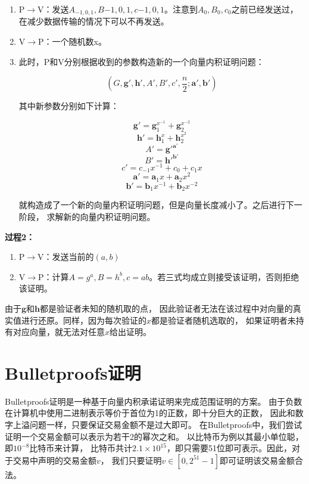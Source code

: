 \begin{enumerate}
    \item P$\to$V：发送$A_{-1, 0, 1}, B{-1, 0, 1}, c{-1, 0, 1}$。注意到$A_0, B_0, c_0$之前已经发送过，
    在减少数据传输的情况下可以不再发送。
    
    \item V$\to$P：一个随机数x。
    
    \item 此时，P和V分别根据收到的参数构造新的一个向量内积证明问题：
    
    $$(G,\boldsymbol{g}',\boldsymbol{h}',A',B',c',\frac{n}{2};\boldsymbol{a}',\boldsymbol{b}')$$
    
    其中新参数分别如下计算：
    
    $$\boldsymbol{g}'=\boldsymbol{g}_1^{x^{-1}}+\boldsymbol{g}_2^{x^{-2}}$$
    $$\boldsymbol{h}'=\boldsymbol{h}_1^{x}+\boldsymbol{h}_2^{x^{2}}$$
    $$A'=\boldsymbol{g}'^{\boldsymbol{a}'}$$
    $$B'=\boldsymbol{h}'^{\boldsymbol{b}'}$$
    $$c'=c_{-1}x^{-1}+c_0+c_1x$$
    $$\boldsymbol{a}'=\boldsymbol{a}_1x+\boldsymbol{a}_2x^2$$
    $$\boldsymbol{b}'=\boldsymbol{b}_1x^{-1}+\boldsymbol{b}_2x^{-2}$$
    
    就构造成了一个新的向量内积证明问题，但是向量长度减小了。之后进行下一阶段，
    求解新的向量内积证明问题。
\end{enumerate}

\textbf{过程2：}
\begin{enumerate}
    \item P$\to$V：发送当前的$(a,b)$
    \item V$\to$P：计算$A=g^a, B=h^b, c=ab$。若三式均成立则接受该证明，否则拒绝该证明。
\end{enumerate}

由于$\boldsymbol{g}$和$\boldsymbol{h}$都是验证者未知的随机取的点，
因此验证者无法在该过程中对向量的真实值进行还原。同样，因为每次验证的$x$都是验证者随机选取的，
如果证明者未持有对应向量，就无法对任意$x$给出证明。

\section{Bulletproofs证明}

Bulletproofs证明是一种基于向量内积承诺证明来完成范围证明的方案。
由于负数在计算机中使用二进制表示等价于首位为1的正数，即十分巨大的正数，
因此和数字上溢问题一样，只要保证交易金额不是过大即可。
在Bulletproofs中，我们尝试证明一个交易金额可以表示为若干2的幂次之和。
以比特币为例以其最小单位聪，即$10^{-8}$比特币来计算，
比特币共计$2.1\times10^{15}$，即只需要51位即可表示。因此，对于交易中声明的交易金额$v$，
我们只要证明$v\in[0, 2^{51}-1]$即可证明该交易金额合法。

